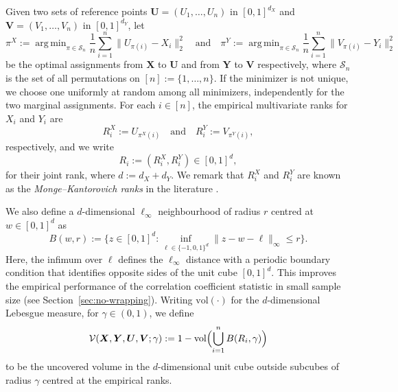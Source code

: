 \documentclass[11pt]{article}
\DeclareMathOperator*{\argmin}{arg\,min}
\newcommand{\vol}{\mathrm{vol}}
\newcommand{\bs}[1]{\boldsymbol{#1}}
\begin{document}
Given two sets of reference points $\bs{U} = (U_1, \ldots, U_n)$ in $[0,1]^{d_X}$ and $\bs{V} = (V_1, \ldots, V_n)$ in $[0,1]^{d_Y}$, let 
\[
\pi^{X} := \argmin_{\pi\in\mathcal{S}_n} \frac{1}{n}\sum_{i=1}^n\|U_{\pi(i)} - X_i\|_2^2 \quad \text{and} \quad \pi^{Y} := \argmin_{\pi\in\mathcal{S}_n} \frac{1}{n}\sum_{i=1}^n\|V_{\pi(i)} - Y_i\|_2^2 
\]
be the optimal assignments from $\bs{X}$ to $\bs{U}$ and from $\bs{Y}$ to $\bs{V}$ respectively, where $\mathcal{S}_n$ is the set of all permutations on $[n]:=\{1,\ldots,n\}$. If the minimizer is not unique, we choose one uniformly at random among all minimizers, independently for the two marginal assignments. For each $i\in[n]$, the empirical multivariate ranks for $X_i$ and $Y_i$ are 
\begin{equation}
R_i^X:=U_{\pi^{X}(i)} \quad \text{and} \quad R_i^Y:=V_{\pi^{Y}(i)}, \label{def:EmpRankGen}
\end{equation} 
respectively, and we write
\begin{equation}
    \label{eq:R_iGen}
R_i:= (R_i^X, R_i^Y)\in [0,1]^d,
\end{equation}
for their joint rank, where $d:= d_X+d_Y$. We remark that $R_i^X$ and $R_i^Y$ are known as the \emph{Monge--Kantorovich ranks} in the literature \citep{chernozhukov2017monge,hallin2021distribution}.

We also define a $d$-dimensional $\ell_\infty$ neighbourhood of radius $r$ centred at $w\in[0,1]^d$ as 
\[  
B(w, r) := \{z\in [0,1]^d: \inf_{\ell\in \{-1,0,1\}^d} \|z - w - \ell\|_\infty \leq r\}.
\]
Here, the infimum over $\ell$ defines the $\ell_\infty$ distance with a periodic boundary condition that identifies opposite sides of the unit cube $[0,1]^d$. This improves the empirical performance of the correlation coefficient statistic in small sample size (see Section~\ref{sec:no-wrapping}). Writing $\mathrm{vol}(\cdot)$ for the $d$-dimensional Lebesgue measure, for $\gamma\in(0,1)$, we define
\begin{equation}
\label{eq:VnGen}
\mathcal{V}(\bs{X},\bs{Y},\bs{U},\bs{V}; \gamma) := 1 - \vol\Bigl(\bigcup_{i=1}^n B(R_i, \gamma)\Bigr)
\end{equation}
to be the uncovered volume in the $d$-dimensional unit cube outside subcubes of radius $\gamma$ centred at the empirical ranks. 
\end{document}
